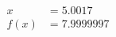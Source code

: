 \documentclass[preview]{standalone}
\begin{document}
\begin{align*}
x &= 5.0017\\f(x) &= 7.9999997
\end{align*}
\end{document}
